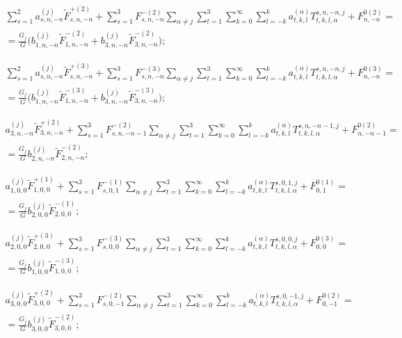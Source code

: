 \begin{multline}
\sum _{s=1}^2 a_{s,n,-n}^{(j)}{\tilde F}_{s,n,-n}^{+(2)}+\sum_{s=1}^3 F_{s,n,-n}^{-(2)}\sum _{\alpha\neq j} \sum _{t=1}^3 \sum _{k=0}^{\infty}\sum_{l=-k}^k a_{t,k,l}^{(\alpha)} T_{t,k,l,\alpha}^{s,n,-n,j}+F_{n,-n}^{0(2)}= \\
=\frac{G_j}{G}\bigg(b_{1,n,-n}^{(j)}{\tilde F}_{1,n,-n}^{-(2)}+b_{3,n,-n}^{(j)}{\tilde F}_{3,n,-n}^{-(2)}\bigg);
\label{eq:13:5a}
\end{multline}

\begin{multline}
\sum _{s=1}^2 a_{s,n,-n}^{(j)}{\tilde F}_{s,n,-n}^{+(3)}+\sum_{s=1}^3 F_{s,n,-n}^{-(3)}\sum _{\alpha\neq j} \sum _{t=1}^3 \sum _{k=0}^{\infty}\sum_{l=-k}^k a_{t,k,l}^{(\alpha)} T_{t,k,l,\alpha}^{s,n,-n,j}+F_{n,-n}^{0(3)}= \\
=\frac{G_j}{G}\bigg(b_{1,n,-n}^{(j)}{\tilde F}_{1,n,-n}^{-(3)}+b_{3,n,-n}^{(j)}{\tilde F}_{3,n,-n}^{-(3)}\bigg);
\label{eq:13:6a}
\end{multline}

\begin{multline}
a_{3,n,-n}^{(j)}{\tilde F}_{3,n,-n}^{+(2)}+\sum_{s=1}^3 F_{s,n,-n-1}^{-(2)}\sum _{\alpha\neq j} \sum _{t=1}^3 \sum _{k=0}^{\infty}\sum_{l=-k}^k a_{t,k,l}^{(\alpha)} T_{t,k,l,\alpha}^{s,n,-n-1,j}+F_{n,-n-1}^{0(2)}= \\
=\frac{G_j}{G}b_{2,n,-n}^{(j)}{\tilde F}_{2,n,-n}^{-(2)};
\label{eq:13:7a}
\end{multline}

\begin{multline}
a_{1,0,0}^{(j)}{\tilde F}_{1,0,0}^{+(1)}+\sum_{s=1}^3 F_{s,0,1}^{-(1)}\sum _{\alpha\neq j} \sum _{t=1}^3 \sum _{k=0}^{\infty}\sum_{l=-k}^k a_{t,k,l}^{(\alpha)} T_{t,k,l,\alpha}^{s,0,1,j}+F_{0,1}^{0(1)}= \\
=\frac{G_j}{G}b_{2,0,0}^{(j)}{\tilde F}_{2,0,0}^{-(1)};
\label{eq:13:8a}
\end{multline}

\begin{multline}
a_{2,0,0}^{(j)}{\tilde F}_{2,0,0}^{+(3)}+\sum_{s=1}^3 F_{s,0,0}^{-(3)}\sum _{\alpha\neq j} \sum _{t=1}^3 \sum _{k=0}^{\infty}\sum_{l=-k}^k a_{t,k,l}^{(\alpha)} T_{t,k,l,\alpha}^{s,0,0,j}+F_{0,0}^{0(3)}= \\
=\frac{G_j}{G}b_{1,0,0}^{(j)}{\tilde F}_{1,0,0}^{-(3)};
\label{eq:13:9a}
\end{multline}

\begin{multline}
a_{3,0,0}^{(j)}{\tilde F}_{3,0,0}^{+(2)}+\sum_{s=1}^3 F_{s,0,-1}^{-(2)}\sum _{\alpha\neq j} \sum _{t=1}^3 \sum _{k=0}^{\infty}\sum_{l=-k}^k a_{t,k,l}^{(\alpha)} T_{t,k,l,\alpha}^{s,0,-1,j}+F_{0,-1}^{0(2)}= \\
=\frac{G_j}{G}b_{3,0,0}^{(j)}{\tilde F}_{3,0,0}^{-(2)};
\label{eq:13:10a}
\end{multline}

